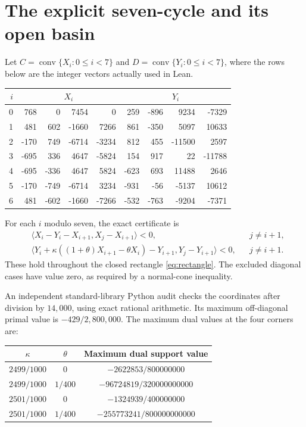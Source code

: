 \documentclass[11pt]{article}
\theoremstyle{remark}\newtheorem{remark}[theorem]{Remark}
\newcommand{\conv}{\operatorname{conv}}
\newcommand{\ip}[2]{\langle #1,#2\rangle}
\begin{document}
\section{The explicit seven-cycle and its open basin}\label{sec:seven}

Let $C=\conv\{X_i:0\le i<7\}$ and $D=\conv\{Y_i:0\le i<7\}$, where the rows below are the integer vectors actually used in Lean.

\begin{center}\small
\begin{tabular}{r|rrrr|rrrr}
\toprule
$i$&\multicolumn{4}{c|}{$X_i$}&\multicolumn{4}{c}{$Y_i$}\\
\midrule
0&768&0&7454&0&259&-896&9234&-7329\\
1&481&602&-1660&7266&861&-350&5097&10633\\
2&-170&749&-6714&-3234&812&455&-11500&2597\\
3&-695&336&4647&-5824&154&917&22&-11788\\
4&-695&-336&4647&5824&-623&693&11488&2646\\
5&-170&-749&-6714&3234&-931&-56&-5137&10612\\
6&481&-602&-1660&-7266&-532&-763&-9204&-7371\\
\bottomrule
\end{tabular}
\end{center}

For each $i$ modulo seven, the exact certificate is
\begin{align}
 &\ip{X_i-Y_i-X_{i+1}}{X_j-X_{i+1}}<0,
       &&j\ne i+1,\label{eq:sevenprimal}\\
 &\ip{Y_i+\kappa((1+\theta)X_{i+1}-\theta X_i)-Y_{i+1}}
        {Y_j-Y_{i+1}}<0,
       &&j\ne i+1.\label{eq:sevendual}
\end{align}
These hold throughout the closed rectangle \eqref{eq:rectangle}. The excluded diagonal cases have value zero, as required by a normal-cone inequality.

An independent standard-library Python audit checks the coordinates after division by $14{,}000$, using exact rational arithmetic. Its maximum off-diagonal primal value is $-429/2{,}800{,}000$. The maximum dual values at the four corners are:

\begin{center}
\begin{tabular}{ccc}
\toprule
$\kappa$ & $\theta$ & Maximum dual support value\\
\midrule
$2499/1000$&$0$&$-2622853/800000000$\\
$2499/1000$&$1/400$&$-96724819/320000000000$\\
$2501/1000$&$0$&$-1324939/400000000$\\
$2501/1000$&$1/400$&$-255773241/800000000000$\\
\bottomrule
\end{tabular}
\end{center}
\end{document}
